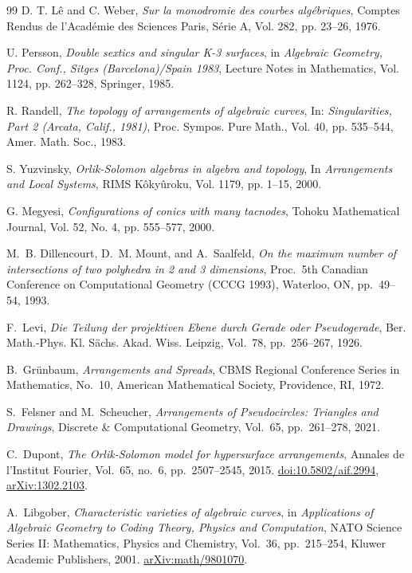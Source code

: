 \documentclass[article,11pt]{amsart} \numberwithin{equation}{section}
\numberwithin{equation}{section}
\begin{document}
{\begin{thebibliography}{99}
	D. T. Lê and C. Weber,
	{\it Sur la monodromie des courbes algébriques},
	Comptes Rendus de l'Académie des Sciences Paris, Série A, Vol. 282, pp. 23--26, 1976.
	
	U. Persson,
	{\it Double sextics and singular K-3 surfaces},
	in {\it Algebraic Geometry, Proc. Conf., Sitges (Barcelona)/Spain 1983},
	Lecture Notes in Mathematics, Vol. 1124, pp. 262--328, Springer, 1985.
	
	R. Randell,
	{\it The topology of arrangements of algebraic curves},
	In: {\it Singularities, Part 2 (Arcata, Calif., 1981)},
	Proc. Sympos. Pure Math., Vol. 40, pp. 535--544, Amer. Math. Soc., 1983.
	
	S. Yuzvinsky,
	{\it Orlik-Solomon algebras in algebra and topology},
	In {\it Arrangements and Local Systems},
	RIMS Kôkyûroku, Vol. 1179, pp. 1--15, 2000.
	
	G. Megyesi,
	{\it Configurations of conics with many tacnodes},
	Tohoku Mathematical Journal, Vol. 52, No. 4, pp. 555--577, 2000.
	
	M.~B. Dillencourt, D.~M. Mount, and A.~Saalfeld,
	\emph{On the maximum number of intersections of two polyhedra in 2 and 3 dimensions},
	Proc.~5th Canadian Conference on Computational Geometry (CCCG 1993),
	Waterloo, ON, pp.~49--54, 1993.
	
	F.~Levi,
	\emph{Die Teilung der projektiven Ebene durch Gerade oder Pseudogerade},
	Ber. Math.-Phys. Kl. S\"achs. Akad. Wiss. Leipzig,
	Vol.~78, pp.~256--267, 1926.
	
	B.~Gr\"unbaum,
	\emph{Arrangements and Spreads},
	CBMS Regional Conference Series in Mathematics, No.~10,
	American Mathematical Society, Providence, RI, 1972.
	
	S.~Felsner and M.~Scheucher,
	\emph{Arrangements of Pseudocircles: Triangles and Drawings},
	Discrete \& Computational Geometry,
	Vol.~65, pp.~261--278, 2021.
	
	C.~Dupont,
	{\it The Orlik-Solomon model for hypersurface arrangements},
	Annales de l'Institut Fourier,
	Vol.~65, no.~6, pp.~2507--2545, 2015.
	\href{https://doi.org/10.5802/aif.2994}{doi:10.5802/aif.2994},
	\href{https://arxiv.org/abs/1302.2103}{arXiv:1302.2103}.
	
	A.~Libgober,
	{\it Characteristic varieties of algebraic curves},
	in {\it Applications of Algebraic Geometry to Coding Theory, Physics and Computation},
	NATO Science Series II: Mathematics, Physics and Chemistry, Vol.~36,
	pp.~215--254, Kluwer Academic Publishers, 2001.
	\href{https://arxiv.org/abs/math/9801070}{arXiv:math/9801070}.
	

\end{thebibliography}}
\end{document}
